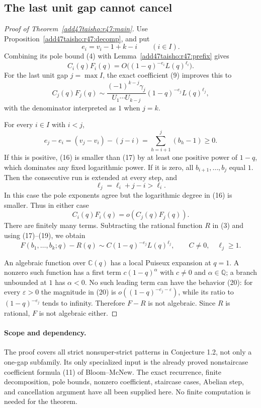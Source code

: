 \documentclass[11pt,a4paper]{article}
\numberwithin{equation}{section}
\theoremstyle{definition}
\theoremstyle{remark}
\begin{document}
\subsection{The last unit gap cannot cancel}

\begin{proof}[Proof of Theorem~\ref{add47taisho:r47:main}]
Use Proposition~\ref{add47taisho:r47:decomp}, and put
\[
 e_i=v_i-1+k-i\qquad(i\in I).
\]
Combining its pole bound (4) with Lemma~\ref{add47taisho:r47:prefix} gives
\[
 C_i(q)F_i(q)
       =O\bigl((1-q)^{-e_i}L(q)^{\ell_i}\bigr).       \tag{16}
\]
For the last unit gap $j=\max I$, the exact coefficient (9) improves
this to
\[
 C_j(q)F_j(q)\sim
 \frac{(-1)^{k-j}\gamma_j}{U_1\cdots U_{k-j}}
       (1-q)^{-e_j}L(q)^{\ell_j},                   \tag{17}
\]
with the denominator interpreted as $1$ when $j=k$.

For every $i\in I$ with $i<j$,
\[
 e_j-e_i=(v_j-v_i)-(j-i)
             =\sum_{h=i+1}^{j}(b_h-1)\ge0.          \tag{18}
\]
If this is positive, (16) is smaller than (17) by at least one
positive power of $1-q$, which dominates any fixed logarithmic
power.  If it is zero, all $b_{i+1},\ldots,b_j$ equal $1$.
Then the consecutive run is extended at every step, and
\[
                  \ell_j=\ell_i+j-i>\ell_i.
\]
In this case the pole exponents agree but the logarithmic degree in
(16) is smaller.  Thus in either case
\[
 C_i(q)F_i(q)=o(C_j(q)F_j(q)).                       \tag{19}
\]
There are finitely many terms.  Subtracting the rational function
$R$ in (3) and using (17)--(19), we obtain
\[
 F(b_1,\ldots,b_k;q)-R(q)
 \sim C(1-q)^{-e_j}L(q)^{\ell_j},\qquad C\ne0,
 \quad\ell_j\ge1.                                  \tag{20}
\]

An algebraic function over $\mathbb C(q)$ has a local Puiseux
expansion at $q=1$.  A nonzero such function has a first term
$c(1-q)^\alpha$ with $c\ne0$ and $\alpha\in\mathbb Q$; a branch
unbounded at $1$ has $\alpha<0$.  No such leading term can have the
behavior (20): for every $\varepsilon>0$ the magnitude in (20) is
$o((1-q)^{-e_j-\varepsilon})$, while its ratio to
$(1-q)^{-e_j}$ tends to infinity.  Therefore $F-R$ is not algebraic.
Since $R$ is rational, $F$ is not algebraic either.
\end{proof}

\paragraph{Scope and dependency.}
The proof covers all strict nonsuper-strict patterns in Conjecture 1.2,
not only a one-gap subfamily.  Its only specialized input is the
already proved nonstaircase coefficient formula (11) of Bloom--McNew.
The exact recurrence, finite decomposition, pole bounds, nonzero
coefficient, staircase cases, Abelian step, and cancellation argument
have all been supplied here.  No finite computation is needed for the
theorem.
\end{document}
